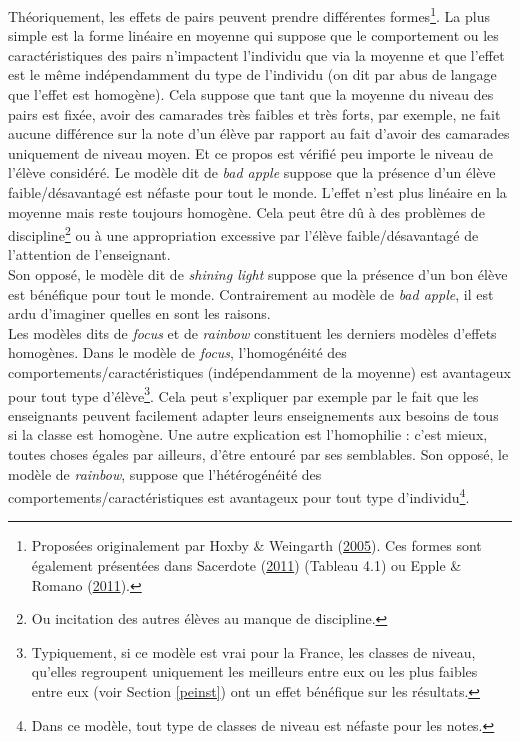 \documentclass[
]{book}
\begin{document}
\quad Théoriquement, les effets de pairs peuvent prendre différentes formes\footnote{Proposées originalement par Hoxby \& Weingarth (\protect\hyperlink{ref-HOX:WEI:05}{2005}). Ces formes sont également présentées dans Sacerdote (\protect\hyperlink{ref-SAC:11}{2011}) (Tableau 4.1) ou Epple \& Romano (\protect\hyperlink{ref-EPP:ROM:11}{2011}).}. La plus simple est la forme linéaire en moyenne qui suppose que le comportement ou les caractéristiques des pairs n'impactent l'individu que via la moyenne et que l'effet est le même indépendamment du type de l'individu (on dit par abus de langage que l'effet est homogène). Cela suppose que tant que la moyenne du niveau des pairs est fixée, avoir des camarades très faibles et très forts, par exemple, ne fait aucune différence sur la note d'un élève par rapport au fait d'avoir des camarades uniquement de niveau moyen. Et ce propos est vérifié peu importe le niveau de l'élève considéré.
Le modèle dit de \emph{bad apple} suppose que la présence d'un élève faible/désavantagé est néfaste pour tout le monde. L'effet n'est plus linéaire en la moyenne mais reste toujours homogène. Cela peut être dû à des problèmes de discipline\footnote{Ou incitation des autres élèves au manque de discipline.} ou à une appropriation excessive par l'élève faible/désavantagé de l'attention de l'enseignant.\\
Son opposé, le modèle dit de \emph{shining light} suppose que la présence d'un bon élève est bénéfique pour tout le monde. Contrairement au modèle de \emph{bad apple}, il est ardu d'imaginer quelles en sont les raisons.\\
Les modèles dits de \emph{focus} et de \emph{rainbow} constituent les derniers modèles d'effets homogènes. Dans le modèle de \emph{focus}, l'homogénéité des comportements/caractéristiques (indépendamment de la moyenne) est avantageux pour tout type d'élève\footnote{Typiquement, si ce modèle est vrai pour la France, les classes de niveau, qu'elles regroupent uniquement les meilleurs entre eux ou les plus faibles entre eux (voir Section \ref{peinst}) ont un effet bénéfique sur les résultats.}. Cela peut s'expliquer par exemple par le fait que les enseignants peuvent facilement adapter leurs enseignements aux besoins de tous si la classe est homogène. Une autre explication est l'homophilie : c'est mieux, toutes choses égales par ailleurs, d'être entouré par ses semblables.
Son opposé, le modèle de \emph{rainbow}, suppose que l'hétérogénéité des comportements/caractéristiques est avantageux pour tout type d'individu\footnote{Dans ce modèle, tout type de classes de niveau est néfaste pour les notes.}.\\
\end{document}
